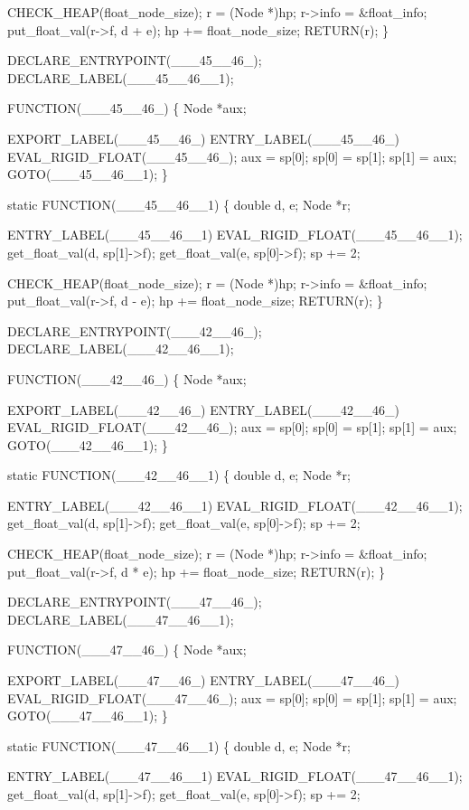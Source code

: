     CHECK_HEAP(float_node_size);
    r       = (Node *)hp;
    r->info = &float_info;
    put_float_val(r->f, d + e);
    hp += float_node_size;
    RETURN(r);
\}


DECLARE_ENTRYPOINT(___45__46_);
DECLARE_LABEL(___45__46__1);

FUNCTION(___45__46_)
\{
    Node *aux;

    EXPORT_LABEL(___45__46_)
 ENTRY_LABEL(___45__46_)
    EVAL_RIGID_FLOAT(___45__46_);
    aux   = sp[0];
    sp[0] = sp[1];
    sp[1] = aux;
    GOTO(___45__46__1);
\}

static
FUNCTION(___45__46__1)
\{
    double d, e;
    Node   *r;

 ENTRY_LABEL(___45__46__1)
    EVAL_RIGID_FLOAT(___45__46__1);
    get_float_val(d, sp[1]->f);
    get_float_val(e, sp[0]->f);
    sp += 2;

    CHECK_HEAP(float_node_size);
    r       = (Node *)hp;
    r->info = &float_info;
    put_float_val(r->f, d - e);
    hp += float_node_size;
    RETURN(r);
\}


DECLARE_ENTRYPOINT(___42__46_);
DECLARE_LABEL(___42__46__1);

FUNCTION(___42__46_)
\{
    Node *aux;

    EXPORT_LABEL(___42__46_)
 ENTRY_LABEL(___42__46_)
    EVAL_RIGID_FLOAT(___42__46_);
    aux   = sp[0];
    sp[0] = sp[1];
    sp[1] = aux;
    GOTO(___42__46__1);
\}

static
FUNCTION(___42__46__1)
\{
    double d, e;
    Node   *r;

 ENTRY_LABEL(___42__46__1)
    EVAL_RIGID_FLOAT(___42__46__1);
    get_float_val(d, sp[1]->f);
    get_float_val(e, sp[0]->f);
    sp += 2;

    CHECK_HEAP(float_node_size);
    r       = (Node *)hp;
    r->info = &float_info;
    put_float_val(r->f, d * e);
    hp += float_node_size;
    RETURN(r);
\}

DECLARE_ENTRYPOINT(___47__46_);
DECLARE_LABEL(___47__46__1);

FUNCTION(___47__46_)
\{
    Node *aux;

    EXPORT_LABEL(___47__46_)
 ENTRY_LABEL(___47__46_)
    EVAL_RIGID_FLOAT(___47__46_);
    aux   = sp[0];
    sp[0] = sp[1];
    sp[1] = aux;
    GOTO(___47__46__1);
\}

static
FUNCTION(___47__46__1)
\{
    double d, e;
    Node   *r;

 ENTRY_LABEL(___47__46__1)
    EVAL_RIGID_FLOAT(___47__46__1);
    get_float_val(d, sp[1]->f);
    get_float_val(e, sp[0]->f);
    sp += 2;

